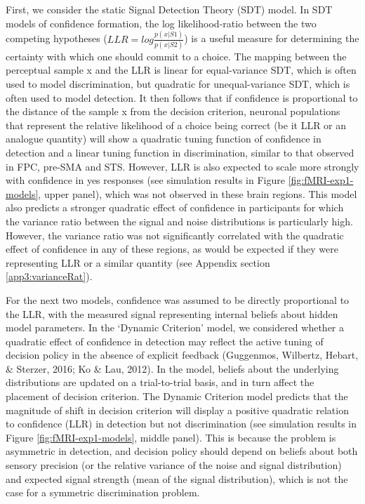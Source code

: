 \documentclass[12pt,twoside]{reedthesis}
\begin{document}
First, we consider the static Signal Detection Theory (SDT) model. In SDT models of confidence formation, the log likelihood-ratio between the two competing hypotheses (\(LLR=log\frac{p(x|S1)}{p(x|S2)}\)) is a useful measure for determining the certainty with which one should commit to a choice. The mapping between the perceptual sample x and the LLR is linear for equal-variance SDT, which is often used to model discrimination, but quadratic for unequal-variance SDT, which is often used to model detection. It then follows that if confidence is proportional to the distance of the sample x from the decision criterion, neuronal populations that represent the relative likelihood of a choice being correct (be it LLR or an analogue quantity) will show a quadratic tuning function of confidence in detection and a linear tuning function in discrimination, similar to that observed in FPC, pre-SMA and STS. However, LLR is also expected to scale more strongly with confidence in yes responses (see simulation results in Figure \ref{fig:fMRI-exp1-models}, upper panel), which was not observed in these brain regions. This model also predicts a stronger quadratic effect of confidence in participants for which the variance ratio between the signal and noise distributions is particularly high. However, the variance ratio was not significantly correlated with the quadratic effect of confidence in any of these regions, as would be expected if they were representing LLR or a similar quantity (see Appendix section \ref{app3:varianceRat}).

For the next two models, confidence was assumed to be directly proportional to the LLR, with the measured signal representing internal beliefs about hidden model parameters. In the `Dynamic Criterion' model, we considered whether a quadratic effect of confidence in detection may reflect the active tuning of decision policy in the absence of explicit feedback (Guggenmos, Wilbertz, Hebart, \& Sterzer, 2016; Ko \& Lau, 2012). In the model, beliefs about the underlying distributions are updated on a trial-to-trial basis, and in turn affect the placement of decision criterion. The Dynamic Criterion model predicts that the magnitude of shift in decision criterion will display a positive quadratic relation to confidence (LLR) in detection but not discrimination (see simulation results in Figure \ref{fig:fMRI-exp1-models}, middle panel). This is because the problem is asymmetric in detection, and decision policy should depend on beliefs about both sensory precision (or the relative variance of the noise and signal distribution) and expected signal strength (mean of the signal distribution), which is not the case for a symmetric discrimination problem.
\end{document}
